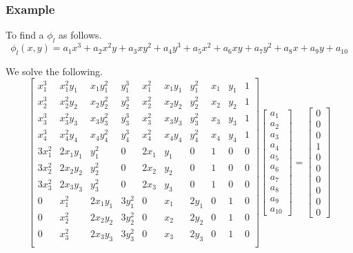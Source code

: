 \documentclass{beamer}
\begin{document}
\begin{frame}
\frametitle{Example}
To find a $\phi_l$ as follows. $$\phi_l(x,y)=a_1 x^3+a_2 x^2 y+a_3 x y^2+a_4 y^3+a_5 x^2+a_6 xy+a_7 y^2+a_8 x+a_9 y+a_{10}$$
	
	We solve the following.
	$$
	\begin{bmatrix}
	x_1^3 & x_1^2 y_1& x_1 y_1^2& y_1^3& x_1^2& x_1y_1& y_1^2& x_1& y_1& 1\\[0.15cm]
	x_2^3 & x_2^2 y_2& x_2 y_2^2& y_2^3& x_2^2& x_2y_2& y_2^2& x_2& y_2& 1\\[0.15cm]
	x_3^3 & x_3^2 y_3& x_3 y_3^2& y_3^3& x_3^2& x_3y_3& y_3^2& x_3& y_3& 1\\[0.15cm]
	x_4^3 & x_4^2 y_4& x_4 y_4^2& y_4^3& x_4^2& x_4y_4& y_4^2& x_4& y_4& 1\\[0.15cm]
	
	3x_1^2 & 2x_1y_1 & y_1^2& 0& 2x_1& y_1& 0& 1& 0& 0\\[0.15cm]
	3x_2^2 & 2x_2y_2 & y_2^2& 0& 2x_2& y_2& 0& 1& 0& 0\\[0.15cm]
	3x_3^2 & 2x_3y_3 & y_3^2& 0& 2x_3& y_3& 0& 1& 0& 0\\[0.15cm]
	
	0 & x_1^2 & 2x_1 y_1& 3y_1^2& 0& x_1& 2y_1& 0& 1& 0\\[0.15cm]
	0 & x_2^2 & 2x_2 y_2& 3y_2^2& 0& x_2& 2y_2& 0& 1& 0\\[0.15cm]
	0 & x_3^2 & 2x_3 y_3& 3y_3^2& 0& x_3& 2y_3& 0& 1& 0\\[0.15cm]
	\end{bmatrix}
	\begin{bmatrix} a_1\\[0.15cm]a_2\\[0.15cm]a_3\\[0.15cm]a_4\\[0.15cm]a_5\\[0.15cm]a_6\\[0.15cm]a_7\\[0.15cm]a_8\\[0.15cm]a_9\\[0.15cm]a_{10} \end{bmatrix}
	=\begin{bmatrix} 0 \\[.15cm]0\\[.15cm]0\\[.15cm]1 \\[.15cm]0\\[.15cm]0\\[.15cm]0\\[.15cm]0\\[.15cm]0\\[.15cm]0 \end{bmatrix}
	$$
\end{frame}
\end{document}
